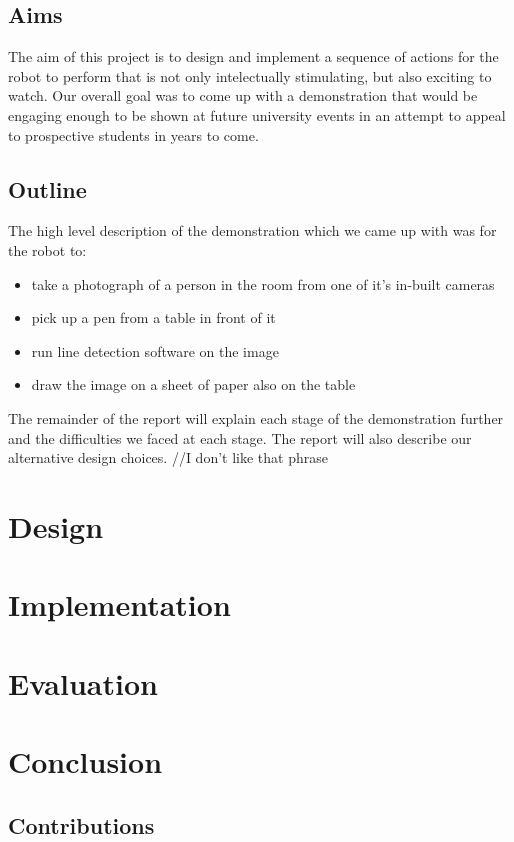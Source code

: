 \documentclass{l3proj}
\begin{document}
\section{Aims}
The aim of this project is to design and implement a sequence of actions for the robot to perform that is not only intelectually stimulating, but also exciting to watch. 
Our overall goal was to come up with a demonstration that would be engaging enough to be shown at future university events in an attempt to appeal to prospective students in years to come.
\section{Outline}
The high level description of the demonstration which we came up with was for the robot to:
\begin{itemize}
\item take a photograph of a person in the room from one of it's in-built cameras
\item pick up a pen from a table in front of it
\item run line detection software on the image
\item draw the image on a sheet of paper also on the table
\end{itemize}
The remainder of the report will explain each stage of the demonstration further and the difficulties we faced at each stage. The report will also describe our alternative design choices. //I don't like that phrase

\chapter{Design}
\label{design}

\chapter{Implementation}
\label{impl}

\chapter{Evaluation}


\chapter{Conclusion}

\section{Contributions}




\end{document}
